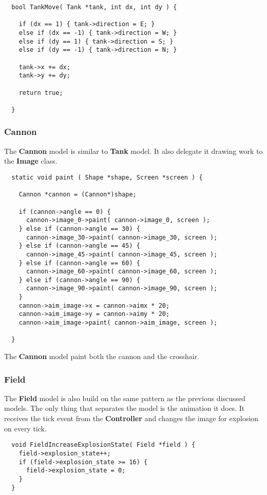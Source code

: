 \begin{lstlisting}
  bool TankMove( Tank *tank, int dx, int dy ) {

    if (dx == 1) { tank->direction = E; }
    else if (dx == -1) { tank->direction = W; }
    else if (dy == 1) { tank->direction = S; }
    else if (dy == -1) { tank->direction = N; }

    tank->x += dx;
    tank->y += dy;

    return true;

  }
\end{lstlisting}
\subsubsection{Cannon}
The {\bf Cannon} model is similar to {\bf Tank} model. It also delegate it drawing work to the {\bf
  Image} class.

\begin{lstlisting}
  static void paint ( Shape *shape, Screen *screen ) {

    Cannon *cannon = (Cannon*)shape;

    if (cannon->angle == 0) {
      cannon->image_0->paint( cannon->image_0, screen );
    } else if (cannon->angle == 30) {
      cannon->image_30->paint( cannon->image_30, screen );
    } else if (cannon->angle == 45) {
      cannon->image_45->paint( cannon->image_45, screen );
    } else if (cannon->angle == 60) {
      cannon->image_60->paint( cannon->image_60, screen );
    } else if (cannon->angle == 90) {
      cannon->image_90->paint( cannon->image_90, screen );
    }
    cannon->aim_image->x = cannon->aimx * 20;
    cannon->aim_image->y = cannon->aimy * 20;
    cannon->aim_image->paint( cannon->aim_image, screen );

  }
\end{lstlisting}
The {\bf Cannon} model paint both the cannon and the crosshair.

\subsubsection{Field}
The {\bf Field} model is also build on the same pattern as the previous discussed models. The only
thing that separates the model is the animation it does. It receives the tick event from the {\bf
  Controller} and changes the image for explosion on every tick.
\begin{lstlisting}
  void FieldIncreaseExplosionState( Field *field ) {
    field->explosion_state++;
    if (field->explosion_state >= 16) {
      field->explosion_state = 0;
    }
  }
\end{lstlisting}

